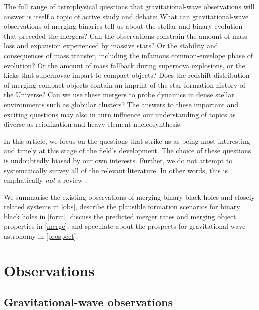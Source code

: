 \documentclass[iop,onecolumn]{revtex4}
\begin{document}
The full range of astrophysical questions that gravitational-wave observations will answer is itself a topic of active study and debate: What can gravitational-wave observations of merging binaries tell us about the stellar and binary evolution that preceded the mergers?  Can the observations constrain the amount of mass loss and expansion experienced by massive stars? Or the stability and consequences of mass transfer, including the infamous common-envelope phase of evolution? Or the amount of mass fallback during supernova explosions, or the kicks that supernovae impart to compact objects? Does the redshift distribution of merging compact objects contain an imprint of the star formation history of the Universe?  Can we use these mergers to probe dynamics in dense stellar environments such as globular clusters? The answers to these important and exciting questions may also in turn influence our understanding of topics as diverse as reionization and heavy-element nucleosynthesis.

In this article, we focus on the questions that strike us as being most interesting and timely at this stage of the field's development.  The choice of these questions is undoubtedly biased by our own interests. Further, we do not attempt to systematically survey all of the relevant literature.  In other words, this is emphatically {\it not} a review \citep{magritte}. 

We summarise the existing observations of merging binary black holes and closely related systems in \autoref{obs}, describe the plausible formation scenarios for binary black holes in \autoref{form}, discuss the predicted merger rates and merging object properties in \autoref{merge}, and speculate about the prospects for gravitational-wave astronomy in \autoref{prospect}.


 

\section{Observations}\label{obs}

\subsection{Gravitational-wave observations}
\end{document}
